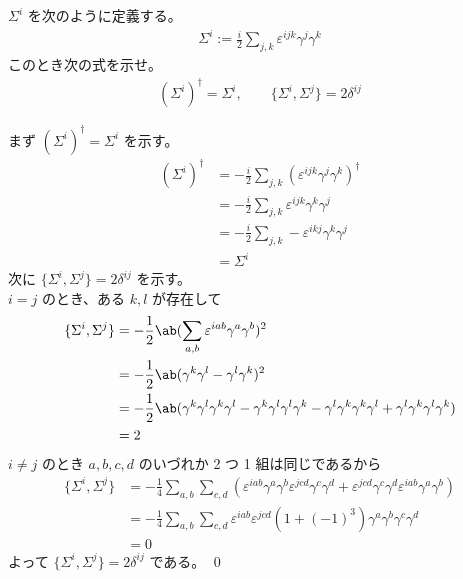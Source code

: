 \documentclass[uplatex,dvipdfmx,a4paper,11pt]{jlreq}
\makeatletter
\numberwithin{equation}{section}
\theoremstyle{definition}
\renewenvironment{proof}[1][\proofname]{\par
  \normalfont
  \topsep6\p@\@plus6\p@ \trivlist
  \item[\hskip\labelsep{\bfseries #1}\@addpunct{\bfseries}]\ignorespaces\quad\par
}{%
  \qed\endtrivlist\@endpefalse
}
\renewcommand\proofname{証明}
\makeatother
\begin{document}
\begin{proposition}
  $\Sigma^i$ を次のように定義する。
  \begin{align}
    \Sigma^i := \frac{i}{2}\sum_{j,k}\varepsilon^{ijk}\gamma^j\gamma^k
  \end{align}
  このとき次の式を示せ。
  \begin{align}
    (\Sigma^i)^\dagger = \Sigma^i, \qquad \lbrace\Sigma^i, \Sigma^j\rbrace = 2\delta^{ij}
  \end{align}
\end{proposition}
\begin{proof}
  まず $(\Sigma^i)^\dagger = \Sigma^i$ を示す。
  \begin{align}
    (\Sigma^i)^\dagger & = -\frac{i}{2}\sum_{j,k}(\varepsilon^{ijk}\gamma^j\gamma^k)^\dagger \\
                       & = -\frac{i}{2}\sum_{j,k}\varepsilon^{ijk}\gamma^k\gamma^j           \\
                       & = -\frac{i}{2}\sum_{j,k}-\varepsilon^{ikj}\gamma^k\gamma^j          \\
                       & = \Sigma^i
  \end{align}
  次に $\lbrace\Sigma^i, \Sigma^j\rbrace = 2\delta^{ij}$ を示す。 \\
  $i = j$ のとき、ある $k, l$ が存在して
  \begin{align}
    \lbrace\Sigma^i, \Sigma^j\rbrace & = -\frac{1}{2}\ab(\sum_{a,b}\varepsilon^{iab}\gamma^a\gamma^b)^2                                                                                             \\
                                     & = -\frac{1}{2}\ab(\gamma^k\gamma^l - \gamma^l\gamma^k)^2                                                                                                     \\
                                     & = -\frac{1}{2}\ab(\gamma^k\gamma^l\gamma^k\gamma^l - \gamma^k\gamma^l\gamma^l\gamma^k - \gamma^l\gamma^k\gamma^k\gamma^l + \gamma^l\gamma^k\gamma^l\gamma^k) \\
                                     & = 2
  \end{align}
  $i \neq j$ のとき $a, b, c, d$ のいづれか 2 つ 1 組は同じであるから
  \begin{align}
    \lbrace\Sigma^i, \Sigma^j\rbrace & = -\frac{1}{4}\sum_{a,b}\sum_{c,d}(\varepsilon^{iab}\gamma^a\gamma^b\varepsilon^{jcd}\gamma^c\gamma^d + \varepsilon^{jcd}\gamma^c\gamma^d\varepsilon^{iab}\gamma^a\gamma^b) \\
                                     & = -\frac{1}{4}\sum_{a,b}\sum_{c,d}\varepsilon^{iab}\varepsilon^{jcd}(1 + (-1)^3)\gamma^a\gamma^b\gamma^c\gamma^d                                                            \\
                                     & = 0
  \end{align}
  よって $\lbrace\Sigma^i, \Sigma^j\rbrace = 2\delta^{ij}$ である。
\end{proof}
\end{document}
